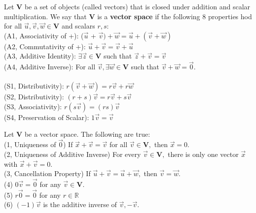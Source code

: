 \documentclass{article}
\begin{document}
\begin{definition}
Let $\textbf{V}$ be a set of objects (called vectors) that is closed under addition and scalar multiplication. We say that $\boldsymbol{V}$ is a \textbf{vector space} if the following $8$ properties hod for all $\vec{u}, \vec{v}, \vec{w} \in \boldsymbol{V}$ and scalars $r, s$: \\

(A1, Associativity of +): ($\vec{u}$ + $\vec{v}) + \vec{w} = \vec{u} + (\vec{v} + \vec{w})$ \\
(A2, Commutativity of +): $\vec{u} + \vec{v} = \vec{v} + \vec{u}$ \\
(A3, Additive Identity): $\exists \vec{z} \in \boldsymbol{V}$ such that $\vec{z} + \vec{v} = \vec{v}$ \\
(A4, Additive Inverse): For all $\vec{v}, \exists \vec{w} \in \boldsymbol{V}$ such that $\vec{v} + \vec{w} = \vec{0}.$ \\ \\

(S1, Distributivity): $r(\vec{v} + \vec{w}) = r\vec{v} + r\vec{w}$ \\
(S2, Distributivity): $(r+s)\vec{v} = r\vec{v} + s\vec{v}$ \\
(S3, Associativity): $r(s\vec{v}) = (rs)\vec{v}$\\
(S4, Preservation of Scalar): $1\vec{v} = \vec{v}$
\end{definition}

\begin{theorem}
Let $\boldsymbol{V}$ be a vector space. The following are true: \\
(1, Uniqueness of $\vec{0}$) If $\vec{x} + \vec{v} = \vec{v}$ for all $\vec{v} \in \boldsymbol{V},$ then $\vec{x} = 0.$ \\
(2, Uniqueness of Additive Inverse) For every $\vec{v} \in \boldsymbol{V},$ there is only one vector $\vec{x}$ with $\vec{x} + \vec{v} = 0.$ \\
(3, Cancellation Property) If $\vec{u} + \vec{v} = \vec{u} + \vec{w},$ then $\vec{v} = \vec{w}$. \\
(4) $0\vec{v} = \vec{0}$ for any $\vec{v} \in \boldsymbol{V}.$ \\
(5) $r\vec{0} = \vec{0}$ for any $r \in \mathbb{R}$ \\
(6) $(-1)\vec{v}$ is the additive inverse of $\vec{v}, -\vec{v}$.  \\ \\
\end{theorem}
\end{document}
